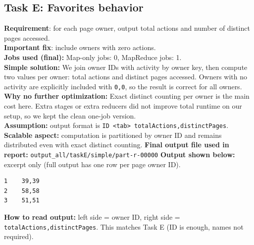 \documentclass[11pt]{article}
\begin{document}
\subsection*{Task E: Favorites behavior}
\textbf{Requirement}: for each page owner, output total actions and number of distinct pages accessed.\\
\textbf{Important fix}: include owners with zero actions.\\
\textbf{Jobs used (final):} Map-only jobs: 0, MapReduce jobs: 1.\\
\textbf{Simple solution:} We join owner IDs with activity by owner key, then compute two values per owner: total actions and distinct pages accessed. Owners with no activity are explicitly included with \texttt{0,0}, so the result is correct for all owners.\\
\textbf{Why no further optimization:} Exact distinct counting per owner is the main cost here. Extra stages or extra reducers did not improve total runtime on our setup, so we kept the clean one-job version.\\
\textbf{Assumption:} output format is \texttt{ID <tab> totalActions,distinctPages}.\\
\textbf{Scalable aspect:} computation is partitioned by owner ID and remains distributed even with exact distinct counting.
\textbf{Final output file used in report:} \texttt{output\_all/taskE/simple/part-r-00000}
\textbf{Output shown below:} excerpt only (full output has one row per page owner ID).
\begin{lstlisting}
1    39,39
2    58,58
3    51,51
\end{lstlisting}
\textbf{How to read output:} left side = owner ID, right side = \texttt{totalActions,distinctPages}. This matches Task E (ID is enough, names not required).
\end{document}
